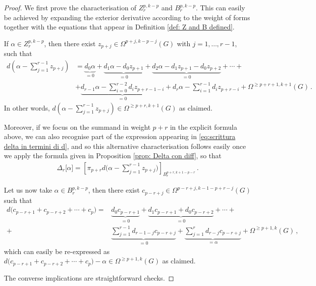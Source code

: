 \documentclass[dvipsnames]{amsart}
\theoremstyle{definition}
\theoremstyle{definition}
\numberwithin{equation}{section}
\begin{document}
\begin{proof}
    We first prove the characterisation of $Z_r^{p,k-p}$ and $B_r^{p,k-p}$. This can easily be achieved by expanding the exterior derivative according to the weight of forms together with the equations that appear in Definition \ref{def: Z and B defined}. 

    If $\alpha\in Z_r^{p,k-p}$, then there exist $z_{p+j}\in\Omega^{p+j,k-p-j}(G)$ with $j=1,\ldots,r-1$, such that 
    \begin{equation*}
    \begin{aligned}
         d(\alpha-\sum_{j=1}^{r-1}z_{p+j})&=\underbrace{{d_0\alpha}}_{=0}+\underbrace{d_1\alpha-d_0z_{p+1}}_{=0}+\underbrace{d_2\alpha-d_1z_{p+1}-d_0z_{p+2}}_{=0}+\cdots+\\ &+\underbrace{d_{r-1}\alpha-\sum_{i=0}^{r-2}d_iz_{p+r-1-i}}_{=0}+d_r\alpha-\sum_{i=1}^{r-1}d_iz_{p+r-i}+\Omega^{\ge p+r+1,k+1}(G)\,.
    \end{aligned}    
    \end{equation*}
    In other words, $d(\alpha-\sum_{j=1}^{r-1}z_{p+j})\in\Omega^{\ge p+r,k+1}(G)$ as claimed. 
    
    Moreover, if we focus on the summand in weight $p+r$ in the explicit formula above, we can also recognise  part of the expression appearing in \eqref{eq:scrittura delta in termini di d}, and so this alternative characterisation follows easily once we apply the formula given in Proposition \ref{prop: Delta con diff}, so that
    \begin{align*}
        \Delta_r\big[\alpha\big]=\left[\pi_{p+r}d\bigg(\alpha-\sum_{j=1}^{r-1}z_{p+j}\bigg)\right]_{B_r^{p+r,k+1-p-r}}\,.
    \end{align*}
    
    Let us now take $\alpha\in B_r^{p,k-p}$, then there exist $c_{p-r+j}\in\Omega^{p-r+j,k-1-p+r-j}(G)$ such that
    \begin{align*}
        d\big( c_{p-r+1} +c_{p-r+2} +\cdots +c_p \big)=&\underbrace{d_0c_{p-r+1}}_{=0}+\underbrace{d_1c_{p-r+1}+d_0c_{p-r+2}}_{=0}+\cdots+\\+&\underbrace{\sum_{j=1}^{r-1}d_{r-1-j}c_{p-r+j}}_{=0}+\underbrace{\sum_{j=1}^{r}d_{r-j}c_{p-r+j}}_{=\alpha}+\Omega^{\ge p+1,k}(G)\,,
    \end{align*}
    which can easily be re-expressed as $d\big( c_{p-r+1} +c_{p-r+2} +\cdots +c_p \big) - \alpha \in \Omega^{\ge p+1,k}(G) $ as claimed.

    The converse implications are straightforward checks.
\end{proof}
    
\end{document}
